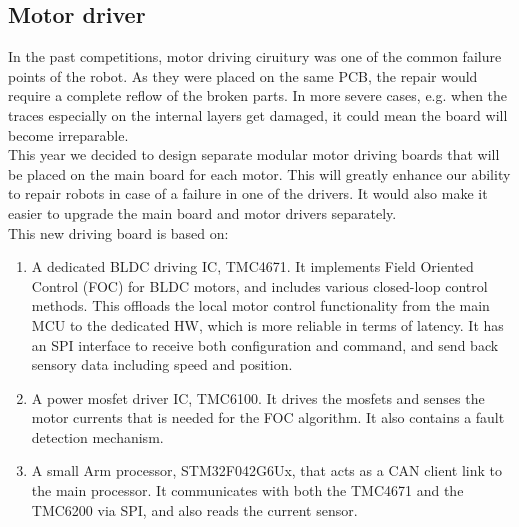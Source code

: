 \documentclass[runningheads]{llncs}
\begin{document}
\subsection{Motor driver}
In the past competitions, motor driving ciruitury was one of the common failure points of the robot. As they were placed on the same PCB, the repair would require a complete reflow of the broken parts. In more severe cases, e.g. when the traces especially on the internal layers get damaged, it could mean the board will become irreparable.\\
This year we decided to design separate modular motor driving boards that will be placed on the main board for each motor. This will greatly enhance our ability to repair robots in case of a failure in one of the drivers. It would also make it easier to upgrade the main board and motor drivers separately.\\
This new driving board is based on:
\begin{enumerate}
    \item A dedicated BLDC driving IC, TMC4671. It implements  Field Oriented Control (FOC) for BLDC motors, and includes various closed-loop control methods. This offloads the local motor control functionality from the main MCU to the dedicated HW, which is more reliable in terms of latency. It has an SPI interface to receive both configuration and command, and send back sensory data including speed and position.
    \item A power mosfet driver IC, TMC6100. It drives the mosfets and senses the motor currents that is needed for the FOC algorithm. It also contains a fault detection mechanism.
    \item A small Arm processor, STM32F042G6Ux, that acts as a CAN client link to the main processor. It communicates with both the TMC4671 and the TMC6200 via SPI, and also reads the current sensor.
\end{enumerate}
\end{document}
